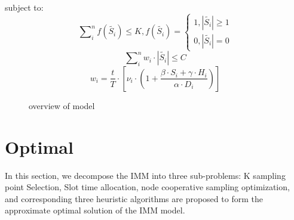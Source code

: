 \documentclass[conference,compsoc]{IEEEtran}
\begin{document}
subject to:
\begin{equation}
\sum\nolimits_i^n {f(\widetilde {{S_i}}) \le } K,f(\widetilde {{S_i}}) = \left\{ \begin{array}{l}
1,\left| {\widetilde {{S_i}}} \right| \ge 1\\
0,\left| {\widetilde {{S_i}}} \right| = 0
\end{array} \right.
\end{equation}
 \begin{equation}
\sum\nolimits_{i}^{n}{{{w}_{i}}\cdot \left| \widetilde{{{S}_{i}}} \right|\le C}
\end{equation}
\begin{equation}
{{w}_{i}}=\frac{t}{T}\cdot [{{\nu }_{i}}\cdot (1+\frac{\beta \cdot {{S}_{i}}+\gamma \cdot {{H}_{i}}}{\alpha \cdot {{D}_{i}}})]
\end{equation}
 
 

\begin{figure}[!!!!!!!!!!!!!!hhhhhhhhhht]
\centering
{}

 
\caption{overview of model}
\label{fig_1_model}
\end{figure}




\section{Optimal}
In this section, we decompose the IMM into three sub-problems: K sampling point Selection, Slot time allocation, node cooperative sampling optimization, and corresponding three heuristic algorithms are proposed to form the approximate optimal solution of the IMM model.
\end{document}

